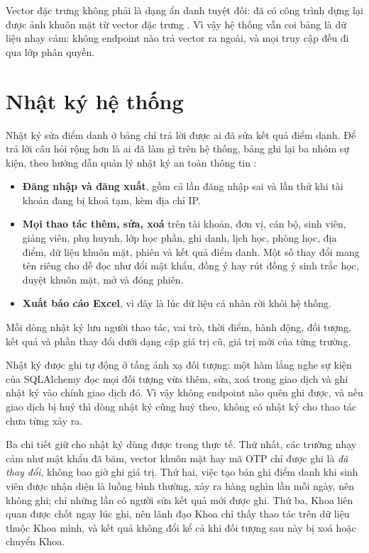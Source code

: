 \begin{luuy}
Vector đặc trưng không phải là dạng ẩn danh tuyệt đối: đã có công trình dựng
lại được ảnh khuôn mặt từ vector đặc trưng \cite{Mai2019Reconstruction}. Vì vậy hệ thống vẫn
coi bảng  là dữ liệu nhạy cảm: không endpoint nào trả
vector ra ngoài, và mọi truy cập đều đi qua lớp phân quyền.
\end{luuy}

\section{Nhật ký hệ thống}
\label{sec:nhatky}

Nhật ký sửa điểm danh ở bảng  chỉ trả lời được ai
đã sửa kết quả điểm danh. Để trả lời câu hỏi rộng hơn là ai đã làm gì trên hệ
thống, bảng  ghi lại ba nhóm sự kiện, theo hướng dẫn quản lý nhật ký an toàn thông tin \cite{Kent2006NIST}:

\begin{itemize}[leftmargin=1.6em, itemsep=3pt]
  \item \textbf{Đăng nhập và đăng xuất}, gồm cả lần đăng nhập sai và lần thử
        khi tài khoản đang bị khoá tạm, kèm địa chỉ IP.
  \item \textbf{Mọi thao tác thêm, sửa, xoá} trên tài khoản, đơn vị, cán bộ,
        sinh viên, giảng viên, phụ huynh, lớp học phần, ghi danh, lịch học,
        phòng học, địa điểm, dữ liệu khuôn mặt, phiên và kết quả điểm danh.
        Một số thay đổi mang tên riêng cho dễ đọc như đổi mật khẩu, đồng ý
        hay rút đồng ý sinh trắc học, duyệt khuôn mặt, mở và đóng phiên.
  \item \textbf{Xuất báo cáo Excel}, vì đây là lúc dữ liệu cá nhân rời khỏi
        hệ thống.
\end{itemize}

Mỗi dòng nhật ký lưu người thao tác, vai trò, thời điểm, hành động, đối
tượng, kết quả và phần thay đổi dưới dạng cặp giá trị cũ, giá trị mới của
từng trường.

\begin{ghinho}
Nhật ký được ghi tự động ở tầng ánh xạ đối tượng: một hàm lắng nghe sự kiện
 của SQLAlchemy đọc mọi đối tượng vừa thêm, sửa, xoá trong
giao dịch và ghi nhật ký vào chính giao dịch đó. Vì vậy không endpoint nào
quên ghi được, và nếu giao dịch bị huỷ thì dòng nhật ký cũng huỷ theo, không
có nhật ký cho thao tác chưa từng xảy ra.
\end{ghinho}

Ba chi tiết giữ cho nhật ký dùng được trong thực tế. Thứ nhất, các trường
nhạy cảm như mật khẩu đã băm, vector khuôn mặt hay mã OTP chỉ được ghi là
\emph{đã thay đổi}, không bao giờ ghi giá trị. Thứ hai, việc tạo bản ghi điểm
danh khi sinh viên được nhận diện là luồng bình thường, xảy ra hàng nghìn lần
mỗi ngày, nên không ghi; chỉ những lần có người sửa kết quả mới được ghi.
Thứ ba, Khoa liên quan được chốt ngay lúc ghi, nên lãnh đạo Khoa chỉ thấy
thao tác trên dữ liệu thuộc Khoa mình, và kết quả không đổi kể cả khi đối
tượng sau này bị xoá hoặc chuyển Khoa.
